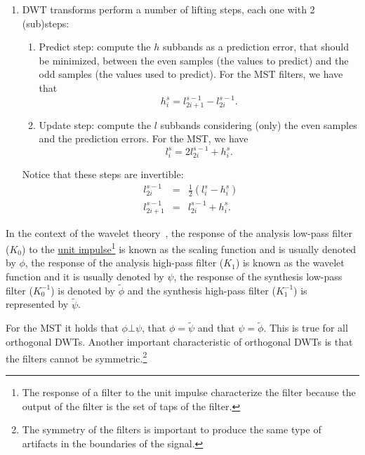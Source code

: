 \begin{enumerate}
\item DWT transforms perform a number of lifting steps, each one with
  2 (sub)steps:
  \begin{enumerate}
  \item Predict step: compute the $h$ subbands as a prediction error,
    that should be minimized, between the even samples (the values to
    predict) and the odd samples (the values used to predict). For the
    MST filters, we have that
    \begin{equation}
      h^s_i = l^{s-1}_{2i+1} - l^{s-1}_{2i}.
    \end{equation}
    
  \item Update step: compute the $l$ subbands considering (only) the even
    samples and the prediction errors. For the MST, we have
    \begin{equation}
      l^s_i = 2l^{s-1}_{2i} + h^s_i.
    \end{equation}
  \end{enumerate}

  Notice that these steps are invertible:
  \begin{equation}
    \begin{array}{rcl}
      l^{s-1}_{2i} & = & \frac{1}{2}(l^s_i - h^s_i)\\
      l^{s-1}_{2i+1} & = & l^{s-1}_{2i} + h^s_i.
    \end{array}
  \end{equation}

\end{enumerate}


In the context of the wavelet theory~\cite{burrus2013wavelets}, the
response of the analysis low-pass filter ($K_0$) to the
\href{https://en.wikipedia.org/?title=Unit_impulse&redirect=no}{unit
  impulse}\footnote{The response of a filter to the unit impulse
  characterize the filter because the output of the filter is the set
  of taps of the filter.} is known as the scaling function and is
usually denoted by $\phi$, the response of the analysis high-pass
filter ($K_1$) is known as the wavelet function and it is usually
denoted by $\psi$, the response of the synthesis low-pass filter
($K^{-1}_0$) is denoted by $\tilde\phi$ and the synthesis high-pass
filter ($K^{-1}_1$) is represented by $\tilde\psi$.

For the MST it holds that $\phi\bot\psi$, that $\phi=\tilde\psi$ and
that $\psi=\tilde\phi$. This is true for all orthogonal DWTs. Another
important characteristic of orthogonal DWTs is that the filters cannot
be symmetric.\footnote{The symmetry of the filters is important to
  produce the same type of artifacts in the boundaries of the signal.}

